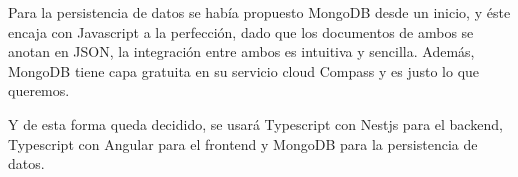 \vspace{1em}
\par Para la persistencia de datos se había propuesto MongoDB desde un inicio, y éste encaja con Javascript a la perfección, dado que los documentos de ambos se anotan en JSON, la integración entre ambos es intuitiva y sencilla. Además, MongoDB tiene capa gratuita en su servicio cloud Compass y es justo lo que queremos. 
\vspace{1em}
\par Y de esta forma queda decidido, se usará Typescript con Nestjs para el backend, Typescript con Angular para el frontend y MongoDB para la persistencia de datos. 
\clearpage
